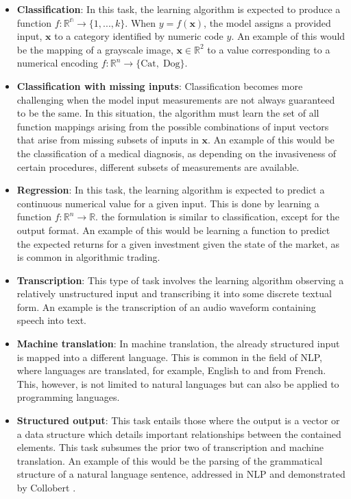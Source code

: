 \begin{itemize}
    \item \textbf{Classification}: In this task, the learning algorithm is expected to produce a function $f: \mathbb{R^n}\rightarrow \{1,...,k\}$. When $y=f(\mathbf{x})$, the model assigns a provided input, $\mathbf{x}$ to a category identified by numeric code $y$. An example of this would be the mapping of a grayscale image, $\mathbf{x}\in\mathbb{R}^2$ to a value corresponding to a numerical encoding $f:\mathbb{R}^n\rightarrow\{\textrm{Cat},\;\textrm{Dog}\}$.
    \item \textbf{Classification with missing inputs}: Classification becomes more challenging when the model input measurements are not always guaranteed to be the same. In this situation, the algorithm must learn the set of all function mappings arising from the possible combinations of input vectors that arise from missing subsets of inputs in $\mathbf{x}$. An example of this would be the classification of a medical diagnosis, as depending on the invasiveness of certain procedures, different subsets of measurements are available.
    \item \textbf{Regression}: In this task, the learning algorithm is expected to predict a continuous numerical value for a given input. This is done by learning a function $f: \mathbb{R}^n\rightarrow\mathbb{R}$. the formulation is similar to classification, except for the output format. An example of this would be learning a function to predict the expected returns for a given investment given the state of the market, as is common in algorithmic trading.
    \item \textbf{Transcription}: This type of task involves the learning algorithm observing a relatively unstructured input and transcribing it into some discrete textual form. An example is the transcription of an audio waveform containing speech into text.
    \item \textbf{Machine translation}: In machine translation, the already structured input is mapped into a different language. This is common in the field of \gls{NLP}, where languages are translated, for example, English to and from French. This, however, is not limited to natural languages but can also be applied to programming languages.
    \item \textbf{Structured output}: This task entails those where the output is a vector or a data structure which details important relationships between the contained elements. This task subsumes the prior two of transcription and machine translation. An example of this would be the parsing of the grammatical structure of a natural language sentence, addressed in \gls{NLP} and demonstrated by Collobert \cite{pmlr-v15-collobert11a}.

\end{itemize}
